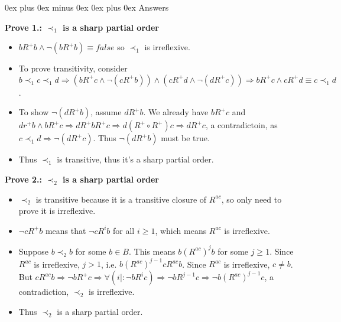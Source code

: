 \documentclass[letterpaper, 8pt]{extarticle}
\makeatletter
\renewcommand{\subsubsection}{\@startsection{subsubsection}{3}{0mm}%
                                {0ex plus 0ex minus 0ex}%
                                {0ex plus 0ex}%
                                {\normalfont\tiny\bfseries}}
\makeatother
\begin{document}
\begin{multicols*}{3}
    \subsubsection{Answers }

    \textbf{Prove 1.: $\prec_1$ is a sharp partial order}

    \begin{itemize}
        \item
              $bR^+b \land \lnot (b R^+ b) \equiv false$ so $\prec_1$ is irreflexive.
        \item
              To prove transitivity, consider $b \prec_1 c \prec_1 d \Rightarrow (bR^+ c \land \lnot (c R^+ b)) \land (c R^+ d \land \lnot (dR^+ c)) \Rightarrow b R^+ c \land c R^+ d \equiv c \prec_1 d$.
        \item
              To show $\lnot (d R^+ b)$, assume $d R^+ b$. We already have $bR^+c$ and $dr^+b \land bR^+c \Rightarrow dR^+ bR^+ c \Rightarrow d(R^+ \circ R^+) c \Rightarrow dR^+c$, a contradictoin, as $c \prec_1 d \Rightarrow \lnot (dR^+ c)$. Thus $\lnot (dR^+b)$ must be true.
        \item
              Thus $\prec_1$ is transitive, thus it's a sharp partial order.
    \end{itemize}

    \textbf{Prove 2.: $\prec_2$ is a sharp partial order}
    \begin{itemize}
        \item
            $\prec_2$ is transitive because it is a transitive closure of $R^{ac}$, so only need to prove it is irreflexive.
        \item
            $\lnot c R^+ b$ means that $\lnot cR^ib$ for all $i \ge 1$, which means $R^{ac}$ is irreflexive.
        \item
            Suppose $b \prec_2 b$ for some $b \in B$. This means $b(R^{ac})^j b$ for some $j \ge 1$. Since $R^{ac}$ is irreflexive, $j > 1$, i.e. $b(R^{ac})^{j-1} cR^{ac} b$. Since $R^{ac}$ is irreflexive, $c \ne b$. But $cR^{ac}b \Rightarrow \lnot b R^+ c \Rightarrow \forall (i \mid : \lnot b R^i c) \Rightarrow \lnot bR^{j-1} c \Rightarrow \lnot b(R^{ac})^{j-1} c$, a contradiction, $\prec_2$ is irreflexive.
        \item
              Thus $\prec_2$ is a sharp partial order.
    \end{itemize}


\end{multicols*}
\end{document}
